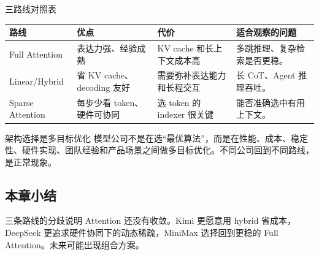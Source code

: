 \begin{knowledgebox}{三路线对照表}
\begin{tabularx}{\textwidth}{p{}p{}p{}X}
\toprule
路线 & 优点 & 代价 & 适合观察的问题 \\
\midrule
Full Attention & 表达力强、经验成熟 & KV cache 和长上下文成本高 & 多跳推理、复杂检索是否更稳。 \\
Linear/Hybrid & 省 KV cache、decoding 友好 & 需要弥补表达能力和长程交互 & 长 CoT、Agent 推理吞吐。 \\
Sparse Attention & 每步少看 token、硬件可协同 & 选 token 的 indexer 很关键 & 能否准确选中有用上下文。 \\
\bottomrule
\end{tabularx}
\end{knowledgebox}

\begin{importantbox}{架构选择是多目标优化}
模型公司不是在选“最优算法”，而是在性能、成本、稳定性、硬件实现、团队经验和产品场景之间做多目标优化。不同公司回到不同路线，是正常现象。
\end{importantbox}

\subsection{本章小结}

三条路线的分歧说明 Attention 还没有收敛。Kimi 更愿意用 hybrid 省成本，DeepSeek 更追求硬件协同下的动态稀疏，MiniMax 选择回到更稳的 Full Attention。未来可能出现组合方案。

